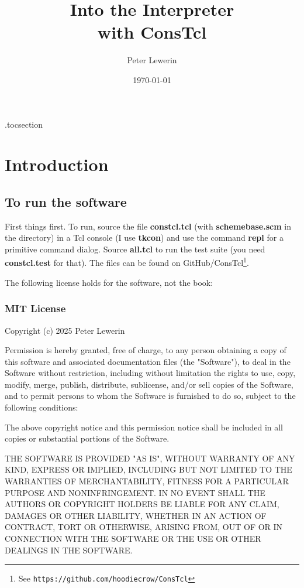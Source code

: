 \documentclass[twoside]{report}
\title{Into the Interpreter\\with ConsTcl}
\author{Peter Lewerin}
\date{\today}
\begin{document}
\pagestyle{headings}
\maketitle

\renewcommand*{\contentsname}{Short contents}
\etocsettocdepth.toc{section}
\tableofcontents

\renewcommand*\contentsname{Detailed contents}
\etocignoretoctocdepth
\tableofcontents


\chapter{Introduction}
\label{introduction}
\section{To run the software}
\label{to-run-the-software}


First things first. To run, source the file \textbf{constcl.tcl} (with
\textbf{schemebase.scm} in the directory) in a Tcl console (I use
\textbf{tkcon}) and use the command \textbf{repl} for a primitive command
dialog. Source \textbf{all.tcl} to run the test suite (you need
\textbf{constcl.test} for that). The files can be found on GitHub/ConsTcl\footnote{See
\texttt{https://github.com/hoodiecrow/ConsTcl}}.

The following license holds for the software, not the book:

\subsection{MIT License}
\label{mit-license}

Copyright (c) 2025 Peter Lewerin

Permission is hereby granted, free of charge, to any person obtaining a copy
of this software and associated documentation files (the "Software"), to deal
in the Software without restriction, including without limitation the rights
to use, copy, modify, merge, publish, distribute, sublicense, and/or sell
copies of the Software, and to permit persons to whom the Software is
furnished to do so, subject to the following conditions:

The above copyright notice and this permission notice shall be included in all
copies or substantial portions of the Software.

THE SOFTWARE IS PROVIDED "AS IS", WITHOUT WARRANTY OF ANY KIND, EXPRESS OR
IMPLIED, INCLUDING BUT NOT LIMITED TO THE WARRANTIES OF MERCHANTABILITY,
FITNESS FOR A PARTICULAR PURPOSE AND NONINFRINGEMENT\@. IN NO EVENT SHALL THE
AUTHORS OR COPYRIGHT HOLDERS BE LIABLE FOR ANY CLAIM, DAMAGES OR OTHER
LIABILITY, WHETHER IN AN ACTION OF CONTRACT, TORT OR OTHERWISE, ARISING FROM,
OUT OF OR IN CONNECTION WITH THE SOFTWARE OR THE USE OR OTHER DEALINGS IN THE
SOFTWARE.
\end{document}
